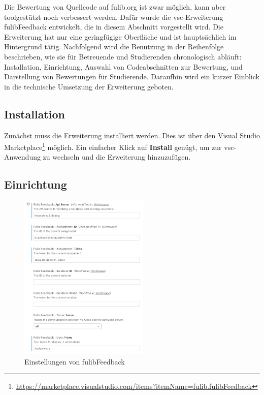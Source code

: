 Die Bewertung von Quellcode auf fulib.org ist zwar möglich, kann aber toolgestützt noch verbessert werden.
Dafür wurde die \ac{vsc}-Erweiterung fulibFeedback entwickelt, die in diesem Abschnitt vorgestellt wird.
Die Erweiterung hat nur eine geringfügige Oberfläche und ist hauptsächlich im Hintergrund tätig.
Nachfolgend wird die Benutzung in der Reihenfolge beschrieben, wie sie für Betreuende und Studierenden chronologisch abläuft:
Installation, Einrichtung, Auswahl von Codeabschnitten zur Bewertung, und Darstellung von Bewertungen für Studierende.
Daraufhin wird ein kurzer Einblick in die technische Umsetzung der Erweiterung geboten.

\subsection{Installation}

Zunächst muss die Erweiterung installiert werden.
Dies ist über den Visual Studio Marketplace\footnote{
    \url{https://marketplace.visualstudio.com/items?itemName=fulib.fulibFeedback}
} möglich.
Ein einfacher Klick auf \textbf{Install} genügt, um zur \ac{vsc}-Anwendung zu wechseln und die Erweiterung hinzuzufügen.

\subsection{Einrichtung}

\begin{figure}
    \centering
    \includegraphics[width=0.55\textwidth]{images/fulibFeedback-settings.png}
    \caption{Einstellungen von fulibFeedback}
    \label{fig:fulibFeedback-settings}
\end{figure}

